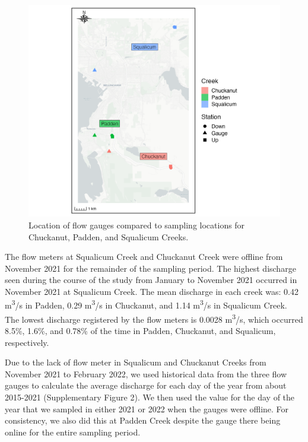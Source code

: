 \documentclass[
]{article}
\begin{document}
\begin{figure}
\centering
\includegraphics{../Output/SupplementalFigures/map_gauges.png}
\caption{Location of flow gauges compared to sampling locations for
Chuckanut, Padden, and Squalicum Creeks.}
\end{figure}

The flow meters at Squalicum Creek and Chuckanut Creek were offline from
November 2021 for the remainder of the sampling period. The highest
discharge seen during the course of the study from January to November
2021 occurred in November 2021 at Squalicum Creek. The mean discharge in
each creek was: 0.42 m\textsuperscript{3}/s in Padden, 0.29
m\textsuperscript{3}/s in Chuckanut, and 1.14 m\textsuperscript{3}/s in
Squalicum Creek. The lowest discharge registered by the flow meters is
0.0028 m\textsuperscript{3}/s, which occurred 8.5\%, 1.6\%, and 0.78\%
of the time in Padden, Chuckanut, and Squalicum, respectively.

Due to the lack of flow meter in Squalicum and Chuckanut Creeks from
November 2021 to February 2022, we used historical data from the three
flow gauges to calculate the average discharge for each day of the year
from about 2015-2021 (Supplementary Figure 2). We then used the value
for the day of the year that we sampled in either 2021 or 2022 when the
gauges were offline. For consistency, we also did this at Padden Creek
despite the gauge there being online for the entire sampling period.
\end{document}
